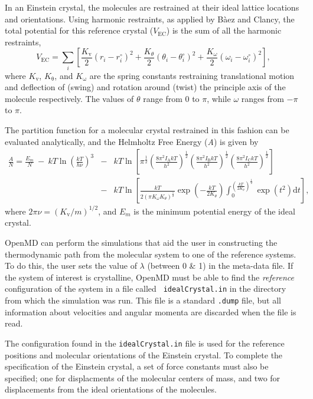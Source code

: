 \documentclass[letterpaper]{report}
\begin{document}
In an Einstein crystal, the molecules are restrained at their ideal
lattice locations and orientations. Using harmonic restraints, as
applied by B\`{a}ez and Clancy, the total potential for this reference
crystal ($V_\mathrm{EC}$) is the sum of all the harmonic restraints,
\begin{equation}
V_\mathrm{EC} = \sum_{i} \left[ \frac{K_\mathrm{v}}{2} (r_i - r_i^\circ)^2 +
\frac{K_\theta}{2} (\theta_i - \theta_i^\circ)^2 +
\frac{K_\omega}{2}(\omega_i - \omega_i^\circ)^2 \right],
\end{equation}
where $K_\mathrm{v}$, $K_\mathrm{\theta}$, and $K_\mathrm{\omega}$ are
the spring constants restraining translational motion and deflection
of (swing) and rotation around (twist) the principle axis of the
molecule respectively.  The values of $\theta$ range from $0$ to
$\pi$, while $\omega$ ranges from $-\pi$ to $\pi$.

The partition function for a molecular crystal restrained in this
fashion can be evaluated analytically, and the Helmholtz Free Energy
({\it A}) is given by
\begin{eqnarray}
\frac{A}{N} = \frac{E_m}{N}\ -\ kT\ln \left (\frac{kT}{h\nu}\right )^3&-&kT\ln \left
[\pi^\frac{1}{2}\left (\frac{8\pi^2I_\mathrm{A}kT}{h^2}\right
)^\frac{1}{2}\left (\frac{8\pi^2I_\mathrm{B}kT}{h^2}\right
)^\frac{1}{2}\left (\frac{8\pi^2I_\mathrm{C}kT}{h^2}\right
)^\frac{1}{2}\right ] \nonumber \\ &-& kT\ln \left [\frac{kT}{2(\pi
K_\omega K_\theta)^{\frac{1}{2}}}\exp\left
(-\frac{kT}{2K_\theta}\right)\int_0^{\left (\frac{kT}{2K_\theta}\right
)^\frac{1}{2}}\exp(t^2)\mathrm{d}t\right ],
\label{ecFreeEnergy}
\end{eqnarray}
where $2\pi\nu = (K_\mathrm{v}/m)^{1/2}$, and $E_m$ is the minimum
potential energy of the ideal crystal.\cite{Baez95a} 

OpenMD can perform the simulations that aid the user in
constructing the thermodynamic path from the molecular system to one
of the reference systems.  To do this, the user sets the value of
$\lambda$ (between 0 \& 1) in the meta-data file.  If the system of
interest is crystalline, OpenMD must be able to find the  {\it
reference} configuration of the system in a file called {\tt
idealCrystal.in} in the directory from which the simulation was run.
This file is a standard {\tt .dump} file, but all information about
velocities and angular momenta are discarded when the file is read. 

The configuration found in the {\tt idealCrystal.in} file is used for 
the reference positions and molecular orientations of the Einstein
crystal.  To complete the specification of the Einstein crystal, a set
of force constants must also be specified; one for displacments of the
molecular centers of mass, and two for displacements from the ideal
orientations of the molecules.  
\end{document}

